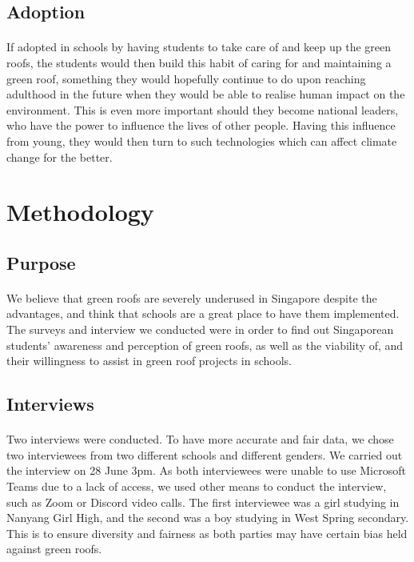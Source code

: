 \documentclass{article}
\begin{document}
\begin{multicols}{2}
  \subsection{Adoption}
  \paragraph{} If adopted in schools by having students to take care
  of and keep up the green roofs, the students would then build this
  habit of caring for and maintaining a green roof, something they would
  hopefully continue to do upon reaching adulthood in the future when
  they would be able to realise human impact on the environment. This is
  even more important should they become national leaders, who have the
  power to influence the lives of other people. Having this influence
  from young, they would then turn to such technologies which can affect
  climate change for the better.

  \section{Methodology}
  \subsection{Purpose}
  \paragraph{} We believe that green roofs are severely underused
  in Singapore despite the advantages, and think that schools are a
  great place to have them implemented. The surveys and interview we
  conducted were in order to find out Singaporean students’ awareness
  and perception of green roofs, as well as the viability of, and their
  willingness to assist in green roof projects in schools.

  \subsection{Interviews}
  \paragraph{} Two interviews were conducted. To have more accurate and
  fair data, we chose two interviewees from two different schools and
  different genders. We carried out the interview on 28 June 3pm. As
  both interviewees were unable to use Microsoft Teams due to a lack
  of access, we used other means to conduct the interview, such as Zoom
  or Discord video calls. The first interviewee was a girl studying in
  Nanyang Girl High, and the second was a boy studying in West Spring
  secondary. This is to ensure diversity and fairness as both parties
  may have certain bias held against green roofs.


\end{multicols}
\end{document}
